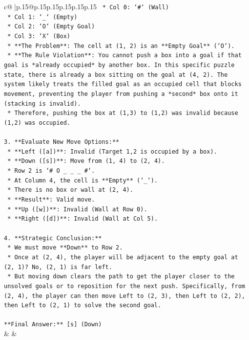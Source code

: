 \documentclass{article}
\begin{document}
{\begin{supertabular}{c@{$\;$}|p{.15\linewidth}@{}p{.15\linewidth}p{.15\linewidth}p{.15\linewidth}p{.15\linewidth}p{.15\linewidth}}
{{{\texttt{        *   Col 0: `\#` (Wall)} \\
\texttt{        *   Col 1: `\_` (Empty)} \\
\texttt{        *   Col 2: `O` (Empty Goal)} \\
\texttt{        *   Col 3: `X` (Box)} \\
\texttt{    *   **The Problem**: The cell at (1, 2) is an **Empty Goal** (`O`).} \\
\texttt{    *   **The Rule Violation**: You cannot push a box into a goal if that goal is *already occupied* by another box. In this specific puzzle state, there is already a box sitting on the goal at (4, 2). The system likely treats the filled goal as an occupied cell that blocks movement, preventing the player from pushing a *second* box onto it (stacking is invalid).} \\
\texttt{    *   Therefore, pushing the box at (1,3) to (1,2) was invalid because (1,2) was occupied.} \\
\\ 
\texttt{3.  **Evaluate New Move Options:**} \\
\texttt{    *   **Left ({[}a{]})**: Invalid (Target 1,2 is occupied by a box).} \\
\texttt{    *   **Down ({[}s{]})**: Move from (1, 4) to (2, 4).} \\
\texttt{        *   Row 2 is `\# O \_ \_ \_ \#`.} \\
\texttt{        *   At Column 4, the cell is **Empty** (`\_`).} \\
\texttt{        *   There is no box or wall at (2, 4).} \\
\texttt{        *   **Result**: Valid move.} \\
\texttt{    *   **Up ({[}w{]})**: Invalid (Wall at Row 0).} \\
\texttt{    *   **Right ({[}d{]})**: Invalid (Wall at Col 5).} \\
\\ 
\texttt{4.  **Strategic Conclusion:**} \\
\texttt{    *   We must move **Down** to Row 2.} \\
\texttt{    *   Once at (2, 4), the player will be adjacent to the empty goal at (2, 1)? No, (2, 1) is far left.} \\
\texttt{    *   But moving down clears the path to get the player closer to the unsolved goals or to reposition for the next push. Specifically, from (2, 4), the player can then move Left to (2, 3), then Left to (2, 2), then Left to (2, 1) to solve the second goal.} \\
\\ 
\texttt{**Final Answer:** {[}s{]} (Down)} \\
            }
        }
    }
    & & \\ \\


\end{supertabular}}
\end{document}
